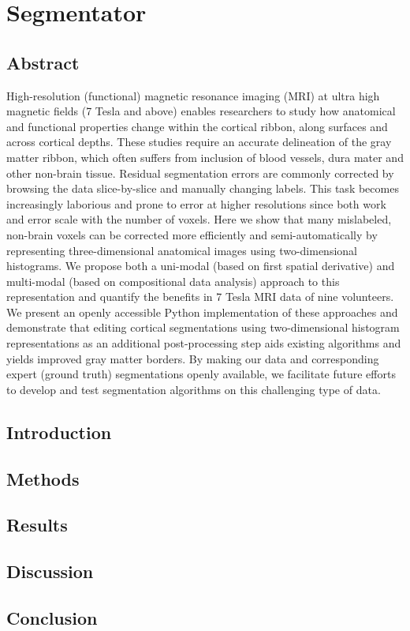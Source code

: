 \chapter{Segmentator}

\section{Abstract}
High-resolution (functional) magnetic resonance imaging (MRI) at ultra high magnetic fields (7 Tesla and above) enables researchers to study how anatomical and functional properties change within the cortical ribbon, along surfaces and across cortical depths. These studies require an accurate delineation of the gray matter ribbon, which often suffers from inclusion of blood vessels, dura mater and other non-brain tissue. Residual segmentation errors are commonly corrected by browsing the data slice-by-slice and manually changing labels. This task becomes increasingly laborious and prone to error at higher resolutions since both work and error scale with the number of voxels. Here we show that many mislabeled, non-brain voxels can be corrected more efficiently and semi-automatically by representing three-dimensional anatomical images using two-dimensional histograms. We propose both a uni-modal (based on first spatial derivative) and multi-modal (based on compositional data analysis) approach to this representation and quantify the benefits in 7 Tesla MRI data of nine volunteers. We present an openly accessible Python implementation of these approaches and demonstrate that editing cortical segmentations using two-dimensional histogram representations as an additional post-processing step aids existing algorithms and yields improved gray matter borders. By making our data and corresponding expert (ground truth) segmentations openly available, we facilitate future efforts to develop and test segmentation algorithms on this challenging type of data.


\section{Introduction}
\lipsum[1-1] 

\section{Methods}
\lipsum[1-2]
\cite{Lakatos1970}

\section{Results}
\lipsum[1-3]

\section{Discussion}
\lipsum[1-4]

\section{Conclusion}
\lipsum[1-5]

\clearpage
\printbibliography[heading=subbibnumbered, title={References}]